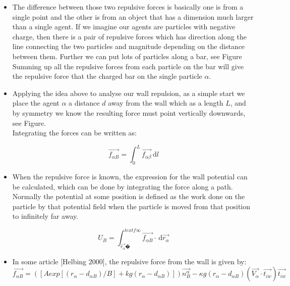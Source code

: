 \begin{itemize}
\item The difference between those two repulsive forces is basically one is from a single point and the other is from an object that has a dimension much larger than a single agent. If we imagine our agents are particles with negative charge, then there is a pair of repulsive forces which has direction along the line connecting the two particles and magnitude depending on the distance between them. Further we can put lots of particles along a bar, see Figure
Summing up all the repulsive forces from each particle on the bar will give the repulsive force that the charged bar on the single particle $\alpha$.

\item Applying the idea above to analyse our wall repulsion, as a simple start we place the agent $\alpha$ a distance $ d $ away from the wall which as a length $L$, and by symmetry we know the resulting force must point vertically downwards, see Figure.\\

Integrating the forces can be written as:

\begin{equation}\label{integ}
\vec{f_{\alpha B}} = 
\int_0^L \! \vec{f_{\alpha\beta}} \, \mathrm{d}l
\end{equation}

\item When the repulsive force is known, the expression for the wall potential can be calculated, which can be done by integrating the force along a path. Normally the potential at some position is defined as the work done on the particle by that potential field when the particle is moved from that position to infinitely far away.

\begin{equation}\label{pot}
	U_{B}= \int_{\vec{r_{\alpha}}�}^{text{f}\infty} \! \vec{f_{\alpha B}} \cdot \, \text{d}\vec{r_{\alpha}} 
\end{equation}

\item In some article [Helbing 2000], the repulsive force from the wall is given by:
\begin{equation}\label{helbing2000}
\vec{f_{\alpha B}} = 
	\left( 
			\left[ 
	A exp 
				\left[ 
						\left(  
							r_{\alpha}-d_{\alpha B}
						\right)  / B
				\right] +kg 
					\left( 
						r_{\alpha}-d_{\alpha B} 
					\right) 
			\right] 
		\right)
	\vec{n_{B}^{\alpha}}-\kappa g 
	\left(
		r_{\alpha}-d_{\alpha B}
	\right) 
	\left(
			\vec{V_{\alpha}}\cdot \vec{t_{iw}}
	\right) 
\vec{t_{iw}}
\end{equation}


\end{itemize}
